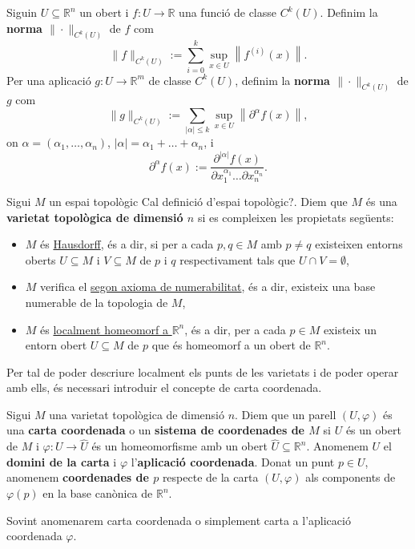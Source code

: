\begin{defi}
    
    Siguin $U\subseteq \mathbb R^n$ un obert i $f:U\to\mathbb R$ una funció de classe $C^k(U)$. Definim la \textbf{norma $\|\cdot\|_{C^k(U)}$} de $f$ com
    \begin{equation*}
        \|f\|_{C^k(U)} := \sum_{i = 0}^k \sup_{x\in U} \left\| f^{(i)}(x) \right\|.
    \end{equation*}
    Per una aplicació $g:U\to\mathbb{R}^m$ de classe $C^k(U)$, definim la \textbf{norma $\|\cdot\|_{C^k(U)}$} de $g$ com
    \begin{equation*}
        \|g\|_{C^k(U)} := \sum_{|\alpha| \leq k} \sup_{x\in U} \left\| \partial^\alpha f(x) \right\|,
    \end{equation*}
    on $\alpha = (\alpha_1, \dots, \alpha_n)$, $|\alpha| = \alpha_1 + \dots + \alpha_n$, i
    \[
    \partial^\alpha f(x) := \frac{\partial^{|\alpha|} f(x)}{\partial x_1^{\alpha_1} \dots \partial x_n^{\alpha_n}}.
    \]




\end{defi}

\begin{defi} 
    Sigui $M$ un espai topològic {\color{blue} Cal definició d'espai topològic?}. Diem que $M$ és una \textbf{varietat topològica de dimensió $n$} si es compleixen les propietats següents:
    \begin{itemize}
        \item $M$ és \underline{Hausdorff}, és a dir, si per a cada $p,q\in M$ amb $p\neq q$ existeixen entorns oberts $U\subseteq M$ i $V\subseteq M$ de $p$ i $q$ respectivament tals que $U\cap V = \emptyset$,
        \item $M$ verifica el \underline{segon axioma de numerabilitat}, és a dir, existeix una base numerable de la topologia de $M$,
        \item $M$ és \underline{localment homeomorf a $\mathbb R^n$}, és a dir, per a cada $p\in M$ existeix un entorn obert $U\subseteq M$ de $p$ que és homeomorf a un obert de $\mathbb R^n$.
    \end{itemize}
\end{defi}

Per tal de poder descriure localment els punts de les varietats i de poder operar amb ells, és necessari introduir el concepte de carta coordenada. 

\begin{defi}
    Sigui $M$ una varietat topològica de dimensió $n$. Diem que un parell $(U,\varphi)$ és una \textbf{carta coordenada} o un \textbf{sistema de coordenades de $M$} si $U$ és un obert de $M$ i $\varphi:U\to\hat U$ és un homeomorfisme amb un obert $\hat U\subseteq\mathbb R^n$. Anomenem $U$ el \textbf{domini de la carta} i $\varphi$ l'\textbf{aplicació coordenada}. Donat un punt $p\in U$, anomenem \textbf{coordenades de $p$} respecte de la carta $(U,\varphi)$ als components de $\varphi(p)$ en la base canònica de $\mathbb R^n$.
\end{defi}
\begin{nota}
    Sovint anomenarem carta coordenada o simplement carta a l'aplicació coordenada $\varphi$.
\end{nota}

